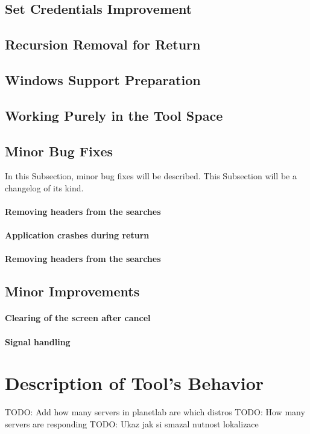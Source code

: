 \subsection{Set Credentials Improvement}
\subsection{Recursion Removal for Return}
\subsection{Windows Support Preparation}
\subsection{Working Purely in the Tool Space}
\subsection{Minor Bug Fixes}
In this Subsection, minor bug fixes will be described. This Subsection will be a changelog of its kind. 
\paragraph{Removing headers from the searches}
\paragraph{Application crashes during return}
\paragraph{Removing headers from the searches}
\subsection{Minor Improvements}
\paragraph{Clearing of the screen after cancel}
\paragraph{Signal handling}
\section{Description of Tool's Behavior}
\label{section:implementapproach}

TODO: Add how many servers in planetlab are which distros
TODO: How many servers are responding
TODO: Ukaz jak si smazal nutnost lokalizace